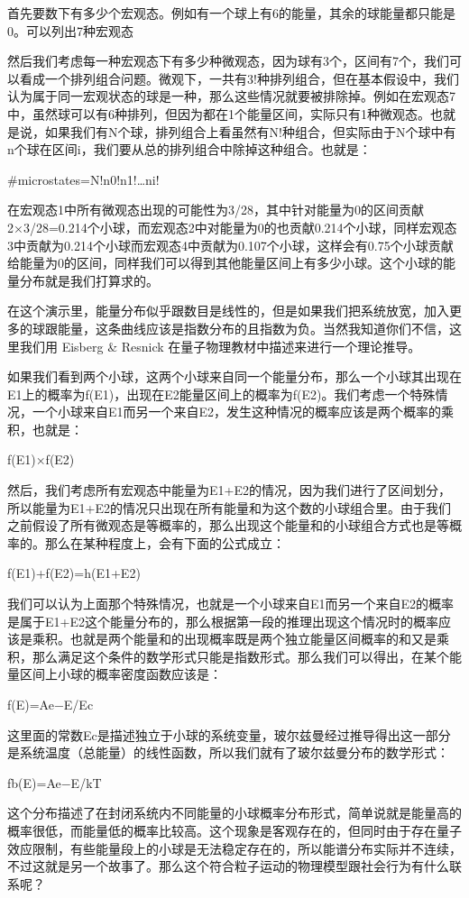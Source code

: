 \documentclass[
]{book}
\begin{document}
首先要数下有多少个宏观态。例如有一个球上有6的能量，其余的球能量都只能是0。可以列出7种宏观态

然后我们考虑每一种宏观态下有多少种微观态，因为球有3个，区间有7个，我们可以看成一个排列组合问题。微观下，一共有3!种排列组合，但在基本假设中，我们认为属于同一宏观状态的球是一种，那么这些情况就要被排除掉。例如在宏观态7中，虽然球可以有6种排列，但因为都在1个能量区间，实际只有1种微观态。也就是说，如果我们有N个球，排列组合上看虽然有N!种组合，但实际由于N个球中有n个球在区间i，我们要从总的排列组合中除掉这种组合。也就是：

\#microstates=N!n0!n1!\ldots ni!

在宏观态1中所有微观态出现的可能性为3/28，其中针对能量为0的区间贡献2×3/28=0.214个小球，而宏观态2中对能量为0的也贡献0.214个小球，同样宏观态3中贡献为0.214个小球而宏观态4中贡献为0.107个小球，这样会有0.75个小球贡献给能量为0的区间，同样我们可以得到其他能量区间上有多少小球。这个小球的能量分布就是我们打算求的。

在这个演示里，能量分布似乎跟数目是线性的，但是如果我们把系统放宽，加入更多的球跟能量，这条曲线应该是指数分布的且指数为负。当然我知道你们不信，这里我们用 Eisberg \& Resnick 在量子物理教材中描述来进行一个理论推导。

如果我们看到两个小球，这两个小球来自同一个能量分布，那么一个小球其出现在E1上的概率为f(E1)，出现在E2能量区间上的概率为f(E2)。我们考虑一个特殊情况，一个小球来自E1而另一个来自E2，发生这种情况的概率应该是两个概率的乘积，也就是：

f(E1)×f(E2)

然后，我们考虑所有宏观态中能量为E1+E2的情况，因为我们进行了区间划分，所以能量为E1+E2的情况只出现在所有能量和为这个数的小球组合里。由于我们之前假设了所有微观态是等概率的，那么出现这个能量和的小球组合方式也是等概率的。那么在某种程度上，会有下面的公式成立：

f(E1)+f(E2)=h(E1+E2)

我们可以认为上面那个特殊情况，也就是一个小球来自E1而另一个来自E2的概率是属于E1+E2这个能量分布的，那么根据第一段的推理出现这个情况时的概率应该是乘积。也就是两个能量和的出现概率既是两个独立能量区间概率的和又是乘积，那么满足这个条件的数学形式只能是指数形式。那么我们可以得出，在某个能量区间上小球的概率密度函数应该是：

f(E)=Ae−E/Ec

这里面的常数Ec是描述独立于小球的系统变量，玻尔兹曼经过推导得出这一部分是系统温度（总能量）的线性函数，所以我们就有了玻尔兹曼分布的数学形式：

fb(E)=Ae−E/kT

这个分布描述了在封闭系统内不同能量的小球概率分布形式，简单说就是能量高的概率很低，而能量低的概率比较高。这个现象是客观存在的，但同时由于存在量子效应限制，有些能量段上的小球是无法稳定存在的，所以能谱分布实际并不连续，不过这就是另一个故事了。那么这个符合粒子运动的物理模型跟社会行为有什么联系呢？
\end{document}
